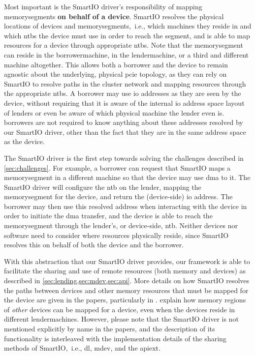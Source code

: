 Most important is the SmartIO driver's responsibility of mapping \glspl{memorysegment} \textbf{on behalf of a device}.
%
SmartIO resolves the physical locations of devices and \glspl{memorysegment},~i.e., which machines they reside in and which \glspl{ntb} the device must use in order to reach the \gls{segment}, and is able to map resources for a device through appropriate \glspl{ntb}.
%
Note that the \gls{memorysegment} can reside in the \gls{borrowermachine}, in the \gls{lendermachine}, or a third and different machine altogether.
%
This allows both a \gls{borrower} and the device to remain agnostic about the underlying, physical \gls{pcie} topology, as they can rely on SmartIO to resolve paths in the cluster network and mapping resources through the appropriate \glspl{ntb}.
%
A \gls{borrower} may use \gls{io} addresses as they are seen by the device, without requiring that it is aware of the internal \gls{io} address space layout of \glspl{lender} or even be aware of which physical machine the \gls{lender} even is.
%
\Glspl{borrower} are not required to know anything about these addresses resolved by our SmartIO driver, other than the fact that they are in the same address space as the device. 




The SmartIO driver is the first step towards solving the challenges described in \cref{sec:challenges}.
%
For example, a \gls{borrower} can request that SmartIO maps a \gls{memorysegment} in a different machine so that the device may use \gls{dma} to it.
%
The SmartIO driver will configure the \gls{ntb} on the \gls{lender}, mapping the \gls{memorysegment} for the device, and return the (device-side) \gls{io} address.
%
The \gls{borrower} may then use this resolved address when interacting with the device in order to initiate the \gls{dma} transfer, and the device is able to reach the \gls{memorysegment} through the lender's, or device-side, \gls{ntb}.
%
Neither devices nor software need to consider where resources physically reside, since SmartIO resolves this on behalf of both the device and the \gls{borrower}.




With this abstraction that our SmartIO driver provides, our framework is able to facilitate the sharing and use of remote resources (both memory and devices) as described in \cref{sec:lending,sec:mdev,sec:api}.
%
More details on how SmartIO resolves the paths between devices and other memory resources that must be mapped for the device are given in the papers, particularly in .
%
 explain how memory regions of \emph{other} devices can be mapped for a device, even when the devices reside in different \glspl{lendermachine}.
%
However, please note that the SmartIO driver is not mentioned explicitly by name in the papers, and the description of its functionality is interleaved with the implementation details of the sharing methods of SmartIO,~i.e., \gls{dl}, \gls{mdev}, and the \gls{apiext}.



